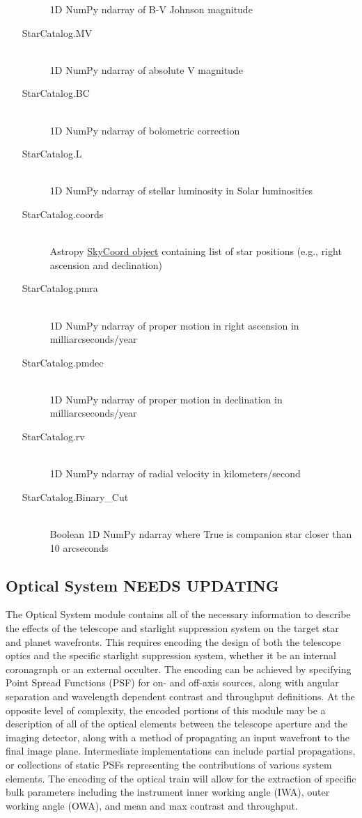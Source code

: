\documentclass[cleanfoot]{asme2ej}
\begin{document}
\begin{itemize}
\begin{description}
        1D NumPy ndarray of B-V Johnson magnitude
        \item[StarCatalog.MV] \hfill \\
        1D NumPy ndarray of absolute V magnitude
        \item[StarCatalog.BC] \hfill \\
        1D NumPy ndarray of bolometric correction
        \item[StarCatalog.L] \hfill \\
        1D NumPy ndarray of stellar luminosity in Solar luminosities
        \item[StarCatalog.coords] \hfill \\
        Astropy \href{http://astropy.readthedocs.org/en/latest/api/astropy.coordinates.SkyCoord.html}{SkyCoord object} containing list of star positions (e.g., right ascension and declination)
        \item[StarCatalog.pmra] \hfill \\
        1D NumPy ndarray of proper motion in right ascension in milliarcseconds/year
        \item[StarCatalog.pmdec] \hfill \\
        1D NumPy ndarray of proper motion in declination in milliarcseconds/year
        \item[StarCatalog.rv] \hfill \\
        1D NumPy ndarray of radial velocity in kilometers/second
        \item[StarCatalog.Binary\_Cut] \hfill \\
        Boolean 1D NumPy ndarray where True is companion star closer than 10 arcseconds
    \end{description}
\end{itemize}


\subsection{Optical System NEEDS UPDATING}
The Optical System module contains all of the necessary information to describe the effects of the telescope and starlight suppression system on the target star and planet wavefronts.  This requires encoding the design of both the telescope optics and the specific starlight suppression system, whether it be an internal coronagraph or an external occulter.  The encoding can be achieved by specifying Point Spread Functions (PSF) for on- and off-axis sources, along with angular separation and wavelength dependent contrast and throughput definitions.  At the opposite level of complexity, the encoded portions of this module may be a description of all of the optical elements between the telescope aperture and the imaging detector, along with a method of propagating an input wavefront to the final image plane.  Intermediate implementations can include partial propagations, or collections of static PSFs representing the contributions of various system elements.  The encoding of the optical train will allow for the extraction of specific bulk parameters including the instrument inner working angle (IWA), outer working angle (OWA), and mean and max contrast and throughput.
\end{document}

